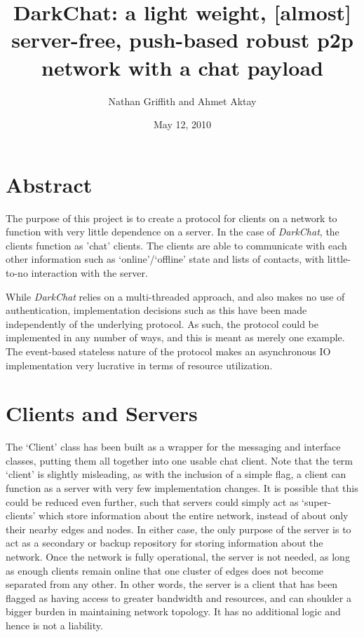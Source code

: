 \documentclass[11pt]{article}
\title{DarkChat: a light weight, [almost] server-free, push-based robust p2p network with a chat payload}
\author{Nathan Griffith and Ahmet Aktay}
\date{May 12, 2010}
\begin{document}
\maketitle %

\section{Abstract}

The purpose of this project is to create a protocol for clients on a network to function with very little dependence on a server. In the case of \emph{DarkChat}, the clients function as 'chat' clients. The clients are able to communicate with each other information such as `online'/`offline' state and lists of contacts, with little-to-no interaction with the server.

While \emph{DarkChat} relies on a multi-threaded approach, and also makes no use of authentication, implementation decisions such as this have been made independently of the underlying protocol. As such, the protocol could be implemented in any number of ways, and this is meant as merely one example. The event-based stateless nature of the protocol makes an asynchronous IO implementation very lucrative in terms of resource utilization.

\section{Clients and Servers}

The `Client' class has been built as a wrapper for the messaging and interface classes, putting them all together into one usable chat client. Note that the term `client' is slightly misleading, as with the inclusion of a simple flag, a client can function as a server with very few implementation changes. It is possible that this could be reduced even further, such that servers could simply act as `super-clients' which store information about the entire network, instead of about only their nearby edges and nodes.
In either case, the only purpose of the server is to act as a secondary or backup repository for storing information about the network. Once the network is fully operational, the server is not needed, as long as enough clients remain online that one cluster of edges does not become separated from any other. In other words, the server is a client that has been flagged as having access to greater bandwidth and resources, and can shoulder a bigger burden in maintaining network topology. It has no additional logic and hence is not a liability.
\end{document}
